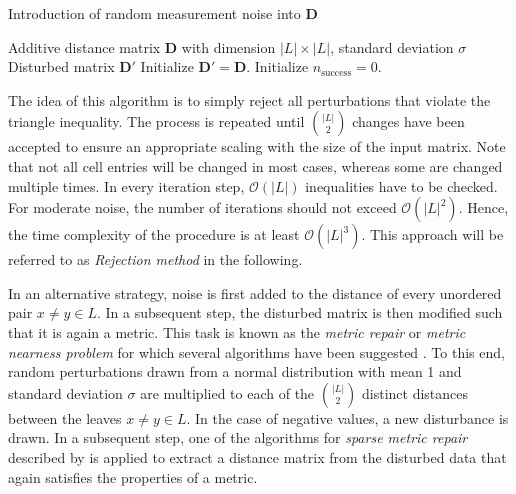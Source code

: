 \documentclass[hidelinks,11pt]{scrreprt}
\begin{document}
\begin{algorithm}[ht]
	\caption{Introduction of random measurement noise into $\mathbf{D}$}
	\label{alg:noise_unbiased}
	\SetAlgoLined
	\DontPrintSemicolon
	\Input Additive distance matrix $\mathbf{D}$ with dimension $|L| \times |L|$, standard deviation $\sigma$ \;
	\Output Disturbed matrix $\mathbf{D}'$ \;
	Initialize $\mathbf{D'} = \mathbf{D}$.\;
	Initialize $n_{\textrm{success}} = 0$.\;
\end{algorithm}

The idea of this algorithm is to simply reject all perturbations that violate the triangle inequality. The process is repeated until $\binom{|L|}{2}$ changes have been accepted to ensure an appropriate scaling with the size of the input matrix. Note that not all cell entries will be changed in most cases, whereas some are changed multiple times. In every iteration step, $\mathcal{O}(|L|)$ inequalities have to be checked. For moderate noise, the number of iterations should not exceed $\mathcal{O}(|L|^2)$. Hence, the time complexity of the procedure is at least $\mathcal{O}(|L|^3)$. This approach will be referred to as \emph{Rejection method} in the following.

In an alternative strategy, noise is first added to the distance of every unordered pair $x \ne y \in L$. In a subsequent step, the disturbed matrix is then modified such that it is again a metric. This task is known as the \textit{metric repair} or \textit{metric nearness problem} for which several algorithms have been suggested \citep[e.g. cf.][]{brickell2008,gilbert2017}. To this end, random perturbations drawn from a normal distribution with mean 1 and standard deviation $\sigma$ are multiplied to each of the $\binom{|L|}{2}$ distinct distances between the leaves $x \ne y \in L$. In the case of negative values, a new disturbance is drawn. In a subsequent step, one of the algorithms for \textit{sparse metric repair} described by \citet{gilbert2017} is applied to extract a distance matrix from the disturbed data that again satisfies the properties of a metric.
\end{document}
